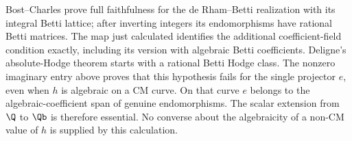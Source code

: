 Bost--Charles \cite[Theorem 3.8(1), equation (3.11), p.17]{EllBostCharles2016} prove full faithfulness for the de Rham--Betti realization with its integral Betti lattice; after inverting integers its endomorphisms have rational Betti matrices. The map just calculated identifies the additional coefficient-field condition exactly, including its version with algebraic Betti coefficients. Deligne's absolute-Hodge theorem \cite[Section 2, definitions on pp.15--16 and Main Theorem 2.11, p.19]{EllDeligne1982} starts with a rational Betti Hodge class. The nonzero imaginary entry above proves that this hypothesis fails for the single projector $e$, even when $h$ is algebraic on a CM curve. On that curve $e$ belongs to the algebraic-coefficient span of genuine endomorphisms. The scalar extension from $\Q$ to $\Qb$ is therefore essential. No converse about the algebraicity of a non-CM value of $h$ is supplied by this calculation.


